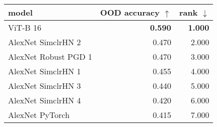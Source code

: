 \begin{tabular}{lrr}
\toprule
model & OOD accuracy $\uparrow$ & rank $\downarrow$ \\
\midrule
ViT-B 16 & \textbf{0.590} & \textbf{1.000} \\
AlexNet SimclrHN 2 & 0.470 & 2.000 \\
AlexNet Robust PGD 1 & 0.470 & 3.000 \\
AlexNet SimclrHN 1 & 0.455 & 4.000 \\
AlexNet SimclrHN 3 & 0.440 & 5.000 \\
AlexNet SimclrHN 4 & 0.420 & 6.000 \\
AlexNet PyTorch & 0.415 & 7.000 \\
\bottomrule
\end{tabular}

